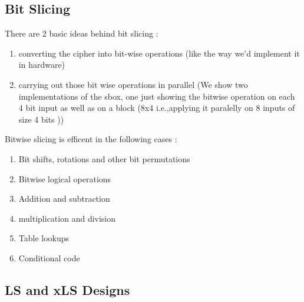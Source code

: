 \documentclass[preprint]{transcrypto}
\begin{document}
\subsection{Bit Slicing}

There are 2 basic ideas behind bit slicing :
\begin{enumerate}
    \item converting the cipher into bit-wise operations (like the way we'd implement it in hardware)
    \item carrying out those bit wise operations in parallel (We show two implementations of the sbox, one just showing the bitwise operation on each 4 bit input as well as on a block (8x4 i.e.,applying it paralelly on 8 inputs of size 4 bits ))
\end{enumerate}
Bitwise slicing is efficent in the following cases :
\begin{enumerate}
    \item Bit shifts, rotations and other bit permutations
    \item Bitwise logical operations
    \item Addition and subtraction
    \item multiplication and division
    \item Table lookups
    \item Conditional code

\end{enumerate}
\subsection{LS and xLS Designs}
\end{document}
